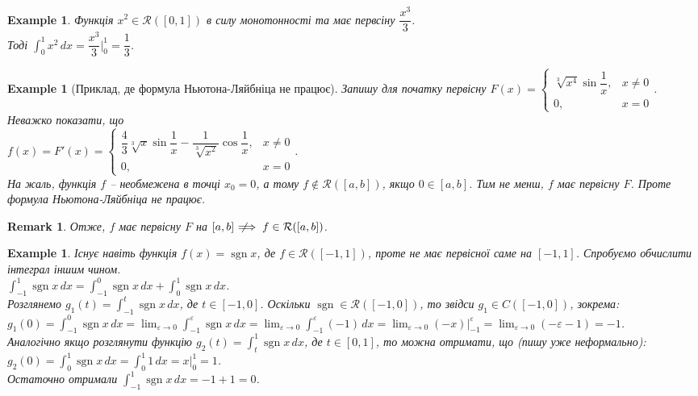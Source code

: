 \documentclass[a4paper, 10pt]{article}
\def\huge{\displaystyle}
\DeclareMathOperator\sign{sgn}
\theoremstyle{theoremdd}
\theoremstyle{theoremdd}
\theoremstyle{theoremdd}
\theoremstyle{theoremdd}
\theoremstyle{theoremdd}
\newtheorem{example}[theorem]{Example}
\theoremstyle{theoremdd}
\theoremstyle{theoremdd}
\newtheorem{remark}[theorem]{Remark}
\theoremstyle{theoremdd}
\theoremstyle{theoremdd}
\newcommand{\notimplies}{\;\not\!\!\!\implies}
\begin{document}
\begin{example}
Функція $x^2 \in \mathcal{R}([0,1])$ в силу монотонності та має первсіну $\dfrac{x^3}{3}$. \\ Тоді $\huge\int_0^1 x^2\,dx = \dfrac{x^3}{3} \Big|_0^1 = \dfrac{1}{3}$.
\end{example}

\begin{example}[Приклад, де формула Ньютона-Ляйбніца не працює]
Запишу для початку первісну $F(x) = \begin{cases} \sqrt[3]{x^4} \sin \dfrac{1}{x}, & x \neq 0 \\ 0, & x = 0 \end{cases}$. Неважко показати, що\\
$f(x) = F'(x) = \begin{cases} \dfrac{4}{3} \sqrt[3]{x} \sin \dfrac{1}{x} - \dfrac{1}{\sqrt[3]{x^2}} \cos \dfrac{1}{x}, & x \neq 0 \\ 0, & x = 0 \end{cases}$.\\
На жаль, функція $f$ -- необмежена в точці $x_0 = 0$, а тому $f \not\in \mathcal{R}([a,b])$, якщо $0 \in [a,b]$. Тим не менш, $f$ має первісну $F$. Проте формула Ньютона-Ляйбніца не працює.
\end{example}

\begin{remark}
Отже, $f$ має первісну $F$ на $[a,b] \notimplies f \in \mathcal{R}([a,b])$.
\end{remark}

\begin{example}
Існує навіть функція $f(x) = \sign x$, де $f \in \mathcal{R}([-1,1])$, проте не має первісної саме на $[-1,1]$. Спробуємо обчислити інтеграл іншим чином.\\
$\huge\int_{-1}^1 \sign x \,dx = \int_{-1}^0 \sign x \,dx + \int_0^1 \sign x \,dx$.\\
Розглянемо $g_1(t) = \huge\int_{-1}^t \sign x\,dx$, де $t \in [-1,0]$. Оскільки $\sign \in \mathcal{R}([-1,0])$, то звідси $g_1 \in C([-1,0])$, зокрема:\\
$g_1(0) = \huge\int_{-1}^0 \sign x\,dx = \lim_{\varepsilon \to 0} \int_{-1}^\varepsilon \sign x\,dx = \lim_{\varepsilon \to 0} \int_{-1}^\varepsilon (-1)\,dx = \lim_{\varepsilon \to 0} (-x)\Big|_{-1}^{\varepsilon} = \lim_{\varepsilon \to 0} (-\varepsilon-1) = -1$.\\
Аналогічно якщо розглянути функцію $g_2(t) = \huge\int_t^1 \sign x\,dx$, де $t \in [0,1]$, то можна отримати, що (пишу уже неформально): \\
$g_2(0) = \huge\int_0^1 \sign x\,dx = \int_0^1 1\,dx = x\Big|_0^1 = 1$.\\
Остаточно отримали $\huge\int_{-1}^1 \sign x \,dx = -1 + 1 = 0$.
\end{example}
\end{document}
